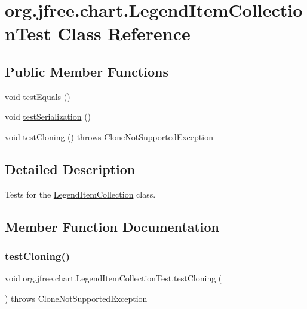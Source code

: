 \hypertarget{classorg_1_1jfree_1_1chart_1_1_legend_item_collection_test}{}\section{org.\+jfree.\+chart.\+Legend\+Item\+Collection\+Test Class Reference}
\label{classorg_1_1jfree_1_1chart_1_1_legend_item_collection_test}
\subsection*{Public Member Functions}
\begin{DoxyCompactItemize}
\item 
void \mbox{\hyperlink{classorg_1_1jfree_1_1chart_1_1_legend_item_collection_test_a6e9ab12a2a16693ae01642cdbfe6257b}{test\+Equals}} ()
\item 
void \mbox{\hyperlink{classorg_1_1jfree_1_1chart_1_1_legend_item_collection_test_a158032f47fd0711ba001b83009aa7ea6}{test\+Serialization}} ()
\item 
void \mbox{\hyperlink{classorg_1_1jfree_1_1chart_1_1_legend_item_collection_test_a55a16c258ecde15ef9464eeacc3ebd20}{test\+Cloning}} ()  throws Clone\+Not\+Supported\+Exception 
\end{DoxyCompactItemize}


\subsection{Detailed Description}
Tests for the \mbox{\hyperlink{classorg_1_1jfree_1_1chart_1_1_legend_item_collection}{Legend\+Item\+Collection}} class. 

\subsection{Member Function Documentation}
\mbox{\label{classorg_1_1jfree_1_1chart_1_1_legend_item_collection_test_a55a16c258ecde15ef9464eeacc3ebd20}} 
\subsubsection{\texorpdfstring{test\+Cloning()}{testCloning()}}
{\footnotesize\ttfamily void org.\+jfree.\+chart.\+Legend\+Item\+Collection\+Test.\+test\+Cloning (\begin{DoxyParamCaption}{ }\end{DoxyParamCaption}) throws Clone\+Not\+Supported\+Exception}

